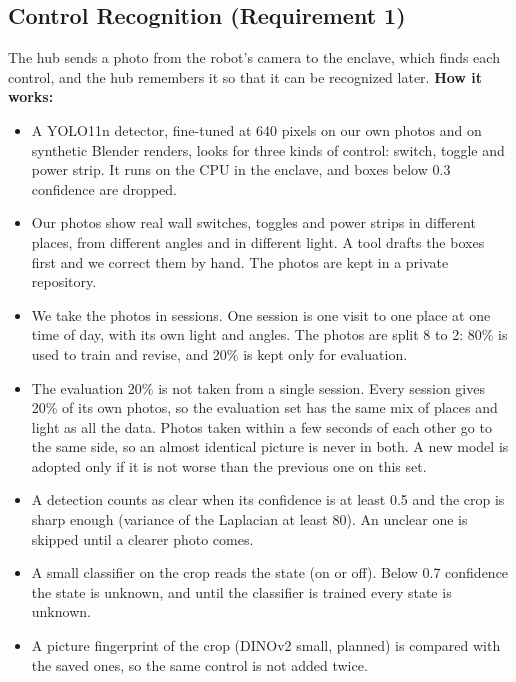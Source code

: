 \documentclass[conference]{IEEEtran}
\begin{document}
\subsection{Control Recognition (Requirement 1)}
The hub sends a photo from the robot's camera to the enclave, which finds each control, and the hub remembers it so that it can be recognized later.
\textbf{How it works:}
\begin{itemize}
\item A YOLO11n detector, fine-tuned at 640 pixels on our own photos and on synthetic Blender renders, looks for three kinds of control: switch, toggle and power strip. It runs on the CPU in the enclave, and boxes below 0.3 confidence are dropped.
\item Our photos show real wall switches, toggles and power strips in different places, from different angles and in different light. A tool drafts the boxes first and we correct them by hand. The photos are kept in a private repository.
\item We take the photos in sessions. One session is one visit to one place at one time of day, with its own light and angles. The photos are split 8 to 2: 80\% is used to train and revise, and 20\% is kept only for evaluation.
\item The evaluation 20\% is not taken from a single session. Every session gives 20\% of its own photos, so the evaluation set has the same mix of places and light as all the data. Photos taken within a few seconds of each other go to the same side, so an almost identical picture is never in both. A new model is adopted only if it is not worse than the previous one on this set.
\item A detection counts as clear when its confidence is at least 0.5 and the crop is sharp enough (variance of the Laplacian at least 80). An unclear one is skipped until a clearer photo comes.
\item A small classifier on the crop reads the state (on or off). Below 0.7 confidence the state is unknown, and until the classifier is trained every state is unknown.
\item A picture fingerprint of the crop (DINOv2 small, planned) is compared with the saved ones, so the same control is not added twice.
\end{itemize}
\end{document}
